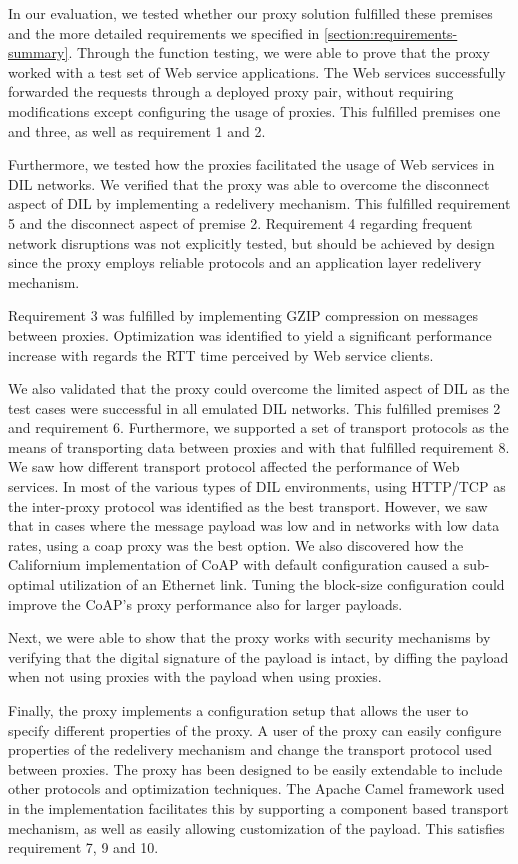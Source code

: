 In our evaluation, we tested whether our proxy solution fulfilled these premises
and the more detailed requirements we specified in
\cref{section:requirements-summary}. Through the function testing, we were able
to prove that the proxy worked with a test set of Web service applications. The
Web services successfully forwarded the requests through a deployed proxy pair,
without requiring modifications except configuring the usage of proxies. This
fulfilled premises one and three, as well as requirement 1 and 2.

Furthermore, we tested how the proxies facilitated the usage of Web services in
DIL networks. We verified that the proxy was able to overcome the disconnect
aspect of DIL by implementing a redelivery mechanism. This fulfilled requirement
5 and the disconnect aspect of premise 2. Requirement 4 regarding frequent
network disruptions was not explicitly tested, but should be achieved by design
since the proxy employs reliable protocols and an application layer redelivery
mechanism.

Requirement 3 was fulfilled by implementing GZIP compression on messages between
proxies. Optimization was identified to yield a significant performance increase with
regards the RTT time perceived by Web service clients.

We also validated that the proxy could overcome the limited aspect of DIL as the
test cases were successful in all emulated DIL networks. This fulfilled premises
2 and requirement 6. Furthermore, we supported a set of transport protocols as
the means of transporting data between proxies and with that fulfilled
requirement 8. We saw how different transport protocol affected the performance
of Web services. In most of the various types of DIL environments, using
HTTP/TCP as the inter-proxy protocol was identified as the best transport.
However, we saw that in cases where the message payload was low and in networks
with low data rates, using a \gls{coap} proxy was the best option. We also
discovered how the Californium implementation of CoAP with default configuration
caused a sub-optimal utilization of an Ethernet link. Tuning the block-size
configuration could improve the CoAP's proxy performance also for larger
payloads.

Next, we were able to show that the proxy works with security mechanisms by
verifying that the digital signature of the payload is intact, by diffing the
payload when not using proxies with the payload when using proxies.

Finally, the proxy implements a configuration setup that allows the user to
specify different properties of the proxy. A user of the proxy can easily
configure properties of the redelivery mechanism and change the transport
protocol used between proxies. The proxy has been designed to be easily
extendable to include other protocols and optimization techniques. The Apache
Camel framework used in the implementation facilitates this by supporting a
component based transport mechanism, as well as easily allowing customization of
the payload. This satisfies requirement 7, 9 and 10.



